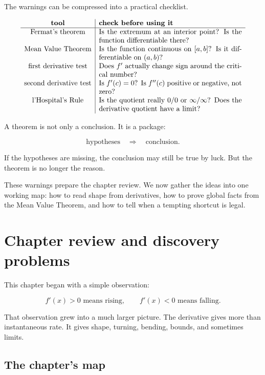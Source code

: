 The warnings can be compressed into a practical checklist.

\[
\begin{array}{c|p{0.58\textwidth}}
\textbf{tool} & \textbf{check before using it} \\ \hline
\text{Fermat's theorem}
& Is the extremum at an interior point?  Is the function differentiable there? \\[4pt]

\text{Mean Value Theorem}
& Is the function continuous on \([a,b]\)?  Is it differentiable on \((a,b)\)? \\[4pt]

\text{first derivative test}
& Does \(f'\) actually change sign around the critical number? \\[4pt]

\text{second derivative test}
& Is \(f'(c)=0\)?  Is \(f''(c)\) positive or negative, not zero? \\[4pt]

\text{l'Hospital's Rule}
& Is the quotient really \(0/0\) or \(\infty/\infty\)?  Does the derivative quotient have a limit?
\end{array}
\]

A theorem is not only a conclusion.  It is a package:

\[
\text{hypotheses}
\quad\Longrightarrow\quad
\text{conclusion}.
\]

If the hypotheses are missing, the conclusion may still be true by luck.  But the theorem
is no longer the reason.

These warnings prepare the chapter review.  We now gather the ideas into one working
map: how to read shape from derivatives, how to prove global facts from the Mean Value
Theorem, and how to tell when a tempting shortcut is legal.

\section{Chapter review and discovery problems}
\label{sec:chapter-6-review-discovery}

This chapter began with a simple observation:

\[
f'(x)>0 \text{ means rising},
\qquad
f'(x)<0 \text{ means falling}.
\]

That observation grew into a much larger picture.  The derivative gives more than
instantaneous rate.  It gives shape, turning, bending, bounds, and sometimes limits.

\subsection{The chapter's map}
\label{subsec:chapter-6-map}

